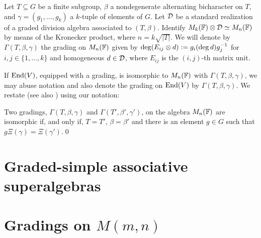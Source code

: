 \begin{defi}\label{def:explicit-grd-assoc}
	Let $T \subseteq G$ be a finite subgroup, $\beta$ a nondegenerate alternating bicharacter on $T$, and $\gamma = (g_1, \ldots, g_k)$ a $k$-tuple of elements of $G$. Let $\mathcal{D}$ be a standard realization of a graded division algebra associated to $(T, \beta)$. Identify $M_k(\mathbb{F})\otimes \mathcal{D} \simeq M_n(\mathbb{F})$ by means of the Kronecker product, where $n=k\sqrt{|T|}$. We will denote by $\Gamma(T, \beta, \gamma)$ the grading on $M_n(\mathbb{F})$ given by $\deg (E_{ij} \otimes d) := g_i (\deg d) g_j^{-1}$ for $i,j\in \{1, \ldots , k\}$ and homogeneous $d\in \mathcal{D}$, where $E_{ij}$ is the $(i,j)$-th matrix unit.
\end{defi}

If $\operatorname{End}(V)$, equipped with a grading, is isomorphic to $M_n(\mathbb{F})$ with $\Gamma(T, \beta, \gamma)$, we may abuse notation and also denote the grading on $\operatorname{End}(V)$ by $\Gamma(T,\beta,\gamma)$.
We restate \cite[Theorem 2.27]{livromicha} (see also \cite[Theorem 2.6]{BK10}) using our notation:

\begin{thm}\label{thm:classification-matrix}%
	Two gradings, $\Gamma(T,\beta,\gamma)$ and $\Gamma(T',\beta',\gamma')$, on the algebra $M_n(\mathbb{F})$ are isomorphic if, and only if, $T=T'$, $\beta=\beta'$ and there is an element $g\in G$ such that $g \Xi(\gamma)=\Xi(\gamma')$.\qed
\end{thm}



\section{Graded-simple associative superalgebras}

\section{Gradings on $M(m,n)$}\label{sec:Mmn}

